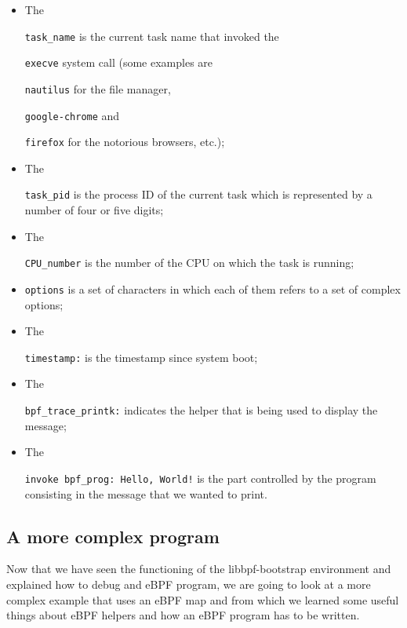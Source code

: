 \begin{itemize}
	\item 
		The \raggedright\colorbox{backcolour}{\lstinline[style=commandline, language=bash]|task_name|} is the current task name that invoked the \raggedright\colorbox{backcolour}{\lstinline[style=commandline, language=bash]|execve|} system call (some examples are \raggedright\colorbox{backcolour}{\lstinline[style=commandline, language=bash]|nautilus|} for the file manager, \raggedright\colorbox{backcolour}{\lstinline[style=commandline, language=bash]|google-chrome|} and \raggedright\colorbox{backcolour}{\lstinline[style=commandline, language=bash]|firefox|} for the notorious browsers, etc.);
	\item 
		The \raggedright\colorbox{backcolour}{\lstinline[style=commandline, language=bash]|task_pid|} is the process ID of the current task which is represented by a number of four or five digits;
	\item 
		The \raggedright\colorbox{backcolour}{\lstinline[style=commandline, language=bash]|CPU_number|} is the number of the CPU on which the task is running;
	\item 
		\raggedright\colorbox{backcolour}{\lstinline[style=commandline, language=bash]|options|} is a set of characters in which each of them refers to a set of complex options;
	\item 
		The \raggedright\colorbox{backcolour}{\lstinline[style=commandline, language=bash]|timestamp:|} is the timestamp since system boot;
	\item 
		The \raggedright\colorbox{backcolour}{\lstinline[style=commandline, language=bash]|bpf_trace_printk:|} indicates the helper that is being used to display the message;
	\item 
		The \raggedright\colorbox{backcolour}{\lstinline[style=commandline, language=bash]|invoke bpf_prog: Hello, World!|} is the part controlled by the program consisting in the message that we wanted to print.
\end{itemize}

\subsection{A more complex program}

Now that we have seen the functioning of the libbpf-bootstrap environment and explained how to debug and eBPF program, we are going to look at a more complex example that uses an eBPF map and from which we learned some useful things about eBPF helpers and how an eBPF program has to be written.

